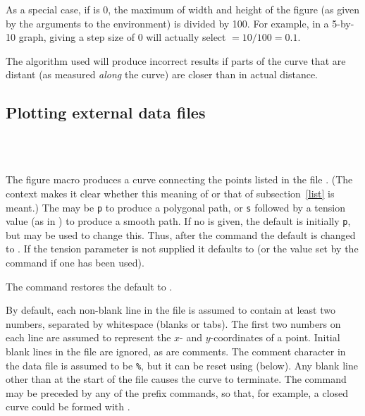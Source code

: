 \documentclass[letterpaper]{article}
\begin{document}
As a special case, if  is 0, the maximum of width and height
of the figure (as given by the arguments to the  environment)
is divided by 100. For example, in a 5-by-10 graph, giving a step size
of $0$ will actually select ${}= 10/100 = 0.1$.

The algorithm used will produce incorrect results if parts of the curve
that are distant (as measured \emph{along} the curve) are closer than
 in actual distance.


\subsection{Plotting external data files}\label{external}

\begin{cd}
\\
\\
%
%
%
\end{cd}

The figure macro  produces a curve connecting the points
listed in the file . (The context makes it clear whether this
meaning of  or that of subsection~\ref{list} is meant.) The
 may be \texttt{p} to produce a polygonal path, or \texttt{s}
followed by a tension value (as in ) to produce a smooth path.
If no  is given, the default is initially \texttt{p}, but
 may be used to change this. Thus, after the command
 the default  is
changed to . If the tension parameter is not
supplied it defaults to  (or the value set by the
 command if one has been used).

The command  restores the default  to
.

By default, each non-blank line in the file is assumed to contain at
least two numbers, separated by whitespace (blanks or tabs). The first
two numbers on each line are assumed to represent the $x$- and
$y$-coordinates of a point. Initial blank lines in the file are ignored,
as are comments. The comment character in the data file is assumed to be
\texttt{\%}, but it can be reset using  (below). Any
blank line other than at the start of the file causes the curve to
terminate. The  command may be preceded by any of the
prefix commands, so that, for example, a closed curve could be formed
with .
\end{document}
